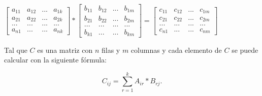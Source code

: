 $\begin{bmatrix}
	a_{11} & a_{12} & ... & a_{1k} \\ 
	a_{21} & a_{22} & ... & a_{2k} \\ 
	... & ... & ... & ... \\ 
	a_{n1} & ... & ... & a_{nk}
\end{bmatrix} * \begin{bmatrix}
	b_{11} & b_{12} & ... & b_{1m} \\ 
	b_{21} & b_{22} & ... & b_{2m} \\ 
	... & ... & ... & ... \\ 
	b_{k1} & ... & ... & b_{km}
\end{bmatrix} = \begin{bmatrix}
	c_{11} & c_{12} & ... & c_{1m} \\ 
	c_{21} & c_{22} & ... & c_{2m} \\ 
	... & ... & ... & ... \\ 
	c_{n1} & ... & ... & c_{nm}
\end{bmatrix} $ 

\vspace*{0.3in}

Tal que $C$ es una matriz con $n$ filas y $m$ columnas y cada elemento de $C$ se puede calcular con la siguiente fórmula:

$$
C_{ij} = \sum_{r=1}^k A_{ir} *B_{rj}.
$$